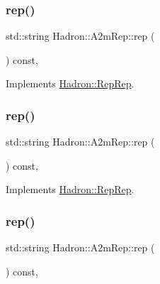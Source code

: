 \subsubsection{\texorpdfstring{rep()}{rep()}\hspace{0.1cm}{\footnotesize\ttfamily [1/3]}}
{\footnotesize\ttfamily std\+::string Hadron\+::\+A2m\+Rep\+::rep (\begin{DoxyParamCaption}{ }\end{DoxyParamCaption}) const\hspace{0.3cm}{\ttfamily [inline]}, {\ttfamily [virtual]}}



Implements \mbox{\hyperlink{structHadron_1_1RepRep_ab3213025f6de249f7095892109575fde}{Hadron\+::\+Rep\+Rep}}.

\mbox{\label{structHadron_1_1A2mRep_a1450e109b5a5fcb9a2098c67305fb5af}} 
\subsubsection{\texorpdfstring{rep()}{rep()}\hspace{0.1cm}{\footnotesize\ttfamily [2/3]}}
{\footnotesize\ttfamily std\+::string Hadron\+::\+A2m\+Rep\+::rep (\begin{DoxyParamCaption}{ }\end{DoxyParamCaption}) const\hspace{0.3cm}{\ttfamily [inline]}, {\ttfamily [virtual]}}



Implements \mbox{\hyperlink{structHadron_1_1RepRep_ab3213025f6de249f7095892109575fde}{Hadron\+::\+Rep\+Rep}}.

\mbox{\label{structHadron_1_1A2mRep_a1450e109b5a5fcb9a2098c67305fb5af}} 
\subsubsection{\texorpdfstring{rep()}{rep()}\hspace{0.1cm}{\footnotesize\ttfamily [3/3]}}
{\footnotesize\ttfamily std\+::string Hadron\+::\+A2m\+Rep\+::rep (\begin{DoxyParamCaption}{ }\end{DoxyParamCaption}) const\hspace{0.3cm}{\ttfamily [inline]}, {\ttfamily [virtual]}}



